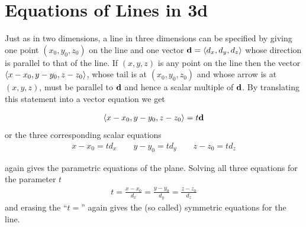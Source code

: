 \section{Equations of Lines in 3d}\label{sec lines 3d}
Just as in two dimensions, a line in three dimensions can be specified  by
giving one point $(x_0,y_0,z_0)$ on the line and one vector 
$\mathbf{d}=\left< d_x,d_y,d_z\right> $ whose direction is parallel to that of the line.
If $(x,y,z)$ is any point on the line then the vector $\left< x-x_0,y-y_0,z-z_0\right> $,
whose tail is at $(x_0,y_0,z_0)$ and whose arrow is at $(x,y,z)$,  must be
parallel to $\mathbf{d}$ and hence a scalar multiple of $\mathbf{d}$. By translating
this statement into a vector equation we get
\begin{impeqn}\label{par eqn of line}
\begin{align*}
\left< x-x_0,y-y_0,z-z_0\right> =t \mathbf{d}
\end{align*}
or the three corresponding scalar equations
\begin{align*}
x-x_0 = t d_x\qquad
y-y_0 = t d_y\qquad
z-z_0 = t d_z
\end{align*}
\end{impeqn}\noindent
again gives the parametric equations of the plane.
Solving all three equations for the parameter $t$ 
\begin{align*}
t=\frac{x-x_0}{d_x}=\frac{y-y_0}{d_y}=\frac{z-z_0}{d_z}
\end{align*}
and erasing the ``$t=$'' again gives the (so called) symmetric 
equations for the line. 

